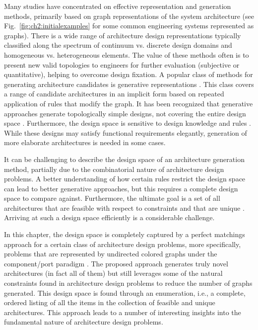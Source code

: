 Many studies have concentrated on effective representation and generation methods, primarily based on graph representations of the system architecture (see Fig.~\ref{fig:ch2:initialexamples} for some common engineering systems represented as graphs). There is a wide range of architecture design representations typically classified along the spectrum of continuum \cite{Hooshmand2012a, Khetan2015a} vs. discrete \cite{Munzer2013a, Guo2014a} design domains and homogeneous \cite{Hooshmand2012a, Khetan2015a} vs. heterogeneous \cite{Schmidt1997a, Munzer2013a} elements. The value of these methods often is to present new valid topologies to engineers for further evaluation (subjective or quantitative), helping to overcome design fixation. A popular class of methods for generating architecture candidates is generative representations \cite{Schmidt1997a, Schmidt2000a, Hornby2003a, Bryant2005a,  Hooshmand2012a,  Starling2005a, Chakrabarti2011a, Guo2014a}. This class covers a range of candidate architectures in an implicit form based on repeated application of rules that modify the graph. It has been recognized that generative approaches generate topologically simple designs, not covering the entire design space \cite{Munzer2013a}. Furthermore, the design space is sensitive to design knowledge \cite{Bryant2005a, Chan2011a} and rules \cite{Hooshmand2012a, Starling2005a}. While these designs may satisfy functional requirements elegantly, generation of more elaborate architectures is needed in some cases.



It can be challenging to describe the design space of an architecture generation method, partially due to the combinatorial nature of architecture design problems. A better understanding of how certain rules restrict the design space can lead to better generative approaches, but this requires a complete design space to compare against. Furthermore, the ultimate goal is a set of all architectures that are feasible with respect to constraints \cite{Wyatt2012a} and that are unique \cite{Schmidt2000a}.  Arriving at such a design space efficiently is a considerable challenge.

In this chapter, the design space is completely captured by a perfect matchings approach for a certain class of architecture design problems, more specifically, problems that are represented by undirected colored graphs under the component/port paradigm \cite{Mittal1989a, Snavely1993a, Munzer2013a}.
The proposed approach generates truly novel architectures (in fact all of them) but still leverages some of the natural constraints found in architecture design problems to reduce the number of graphs generated.
This design space is found through an enumeration, i.e., a complete, ordered listing of all the items in the collection of feasible and unique architectures.
This approach leads to a number of interesting insights into the fundamental nature of architecture design problems.

